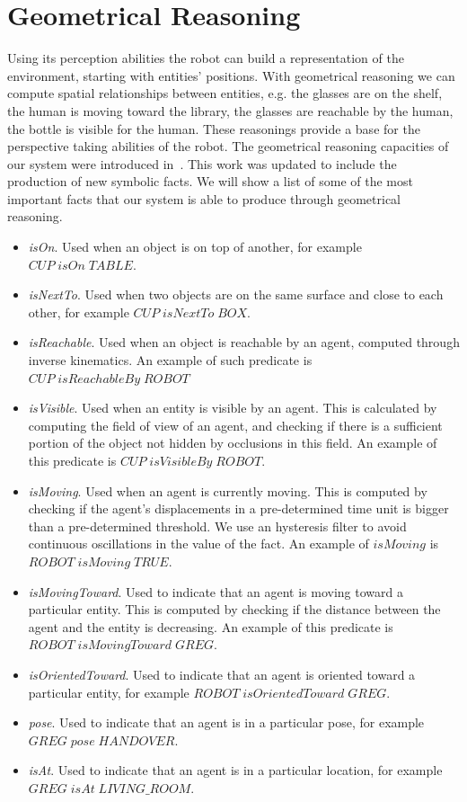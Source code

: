 \section{Geometrical Reasoning}
\label{sec:belief_management-geometrical_reasoning}

Using its perception abilities the robot can build a representation of the environment, starting with entities' positions. With geometrical reasoning we can compute spatial relationships between entities, e.g. the glasses are on the shelf, the human is moving toward the library, the glasses are reachable by the human, the bottle is visible for the human. These reasonings provide a base for the perspective taking abilities of the robot.  The geometrical reasoning capacities of our system were introduced in~\cite{Sisbot2011}. This work was updated to include the production of new symbolic facts. We will show a list of some of the most important facts that our system is able to produce through geometrical reasoning.

\begin{itemize}
\item \textit{isOn}. Used when an object is on top of another, for example $CUP\; isOn\; TABLE$.
\item \textit{isNextTo}. Used when two objects are on the same surface and close to each other, for example $CUP\; isNextTo\; BOX$.
\item \textit{isReachable}. Used when an object is reachable by an agent, computed through inverse kinematics. An example of such predicate is $CUP\; isReachableBy\; ROBOT$
\item \textit{isVisible}. Used when an entity is visible by an agent. This is calculated by computing the field of view of an agent, and checking if there is a sufficient portion of the object not hidden by occlusions in this field. An example of this predicate is $CUP\; isVisibleBy\; ROBOT$.
\item \textit{isMoving}. Used when an agent is currently moving. This is computed by checking if the agent's displacements in a pre-determined time unit is bigger than a pre-determined threshold. We use an hysteresis filter to avoid continuous oscillations in the value of the fact. An example of $isMoving$ is $ROBOT\; isMoving\; TRUE$.
\item \textit{isMovingToward}. Used to indicate that an agent is moving toward a particular entity. This is computed by checking if the distance between the agent and the entity is decreasing. An example of this predicate is $ROBOT\; isMovingToward\; GREG$.
\item \textit{isOrientedToward}. Used to indicate that an agent is oriented toward a particular entity, for example $ROBOT\; isOrientedToward\; GREG$.
\item \textit{pose}. Used to indicate that an agent is in a particular pose, for example $GREG\; pose\; HANDOVER$.
\item \textit{isAt}. Used to indicate that an agent is in a particular location, for example \\ $GREG\; isAt\; LIVING\_ROOM$.
\end{itemize}



